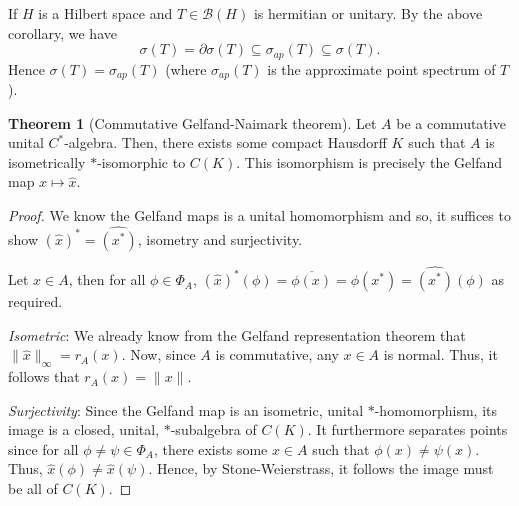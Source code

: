 \documentclass[]{article}
\theoremstyle{definition}
\newtheorem{theorem}{Theorem}
\begin{document}
If \(H\) is a Hilbert space and \(T \in \mathcal{B}(H)\) is hermitian or unitary. By the above 
corollary, we have 
\[\sigma(T) = \partial \sigma(T) \subseteq \sigma_{ap}(T) \subseteq \sigma(T).\]
Hence \(\sigma(T) = \sigma_{ap}(T)\) (where \(\sigma_{ap}(T)\) is the approximate point spectrum 
of \(T\)).

\begin{theorem}[Commutative Gelfand-Naimark theorem]
  Let \(A\) be a commutative unital \(C^*\)-algebra. Then, there exists some compact Hausdorff 
  \(K\) such that \(A\) is isometrically \(*\)-isomorphic to \(C(K)\). This isomorphism is 
  precisely the Gelfand map \(x \mapsto \hat x\).
\end{theorem}
\begin{proof}
  We know the Gelfand maps is a unital homomorphism and so, it suffices to show \((\hat x)^* = \widehat{(x^*)}\),
  isometry and surjectivity.

  Let \(x \in A\), then for all \(\phi \in \Phi_A\), \((\hat x)^*(\phi) = \overline{\phi(x)} = 
  \phi(x^*) = \widehat{(x^*)}(\phi)\) as required.

  \textit{Isometric}: We already know from the Gelfand representation theorem that \(\|\hat x\|_\infty 
  = r_A(x)\). Now, since \(A\) is commutative, any \(x \in A\) is normal. Thus, it follows that 
  \(r_A(x) = \|x\|\).

  \textit{Surjectivity}: Since the Gelfand map is an isometric, unital \(*\)-homomorphism, its image 
  is a closed, unital, \(*\)-subalgebra of \(C(K)\). It furthermore separates points since for all 
  \(\phi \ne \psi \in \Phi_A\), there exists some \(x \in A\) such that \(\phi(x) \ne \psi(x)\). Thus, 
  \(\hat x(\phi) \ne \hat x(\psi)\). Hence, by Stone-Weierstrass, it follows the image must be all 
  of \(C(K)\).
\end{proof}
\end{document}
